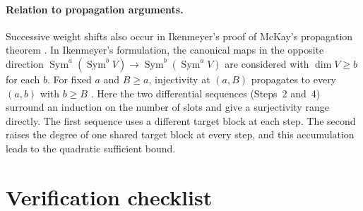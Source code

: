 \documentclass[11pt]{article}
\theoremstyle{remark}
\DeclareMathOperator{\Sym}{Sym}
\begin{document}
\paragraph{Relation to propagation arguments.}
Successive weight shifts also occur in Ikenmeyer's proof
\cite[Section~5]{Ikenmeyer} of McKay's propagation theorem \cite{McKay}.
In Ikenmeyer's formulation, the canonical maps in the opposite direction
$\Sym^a(\Sym^b V)\longrightarrow\Sym^b(\Sym^a V)$ are considered with
$\dim V\ge b$ for each $b$. For fixed $a$ and $B\ge a$, injectivity at
$(a,B)$ propagates to every $(a,b)$ with $b\ge B$
\cite[Theorem~1.3 and Section~3]{Ikenmeyer}.
Here the two differential sequences (Steps~2 and~4) surround an induction
on the number of slots and give a surjectivity range directly. The first
sequence uses a different target block at each step. The second raises the
degree of one shared target block at every step, and this accumulation
leads to the quadratic sufficient bound.

\section{Verification checklist}\label{sec:checklist}
\end{document}
